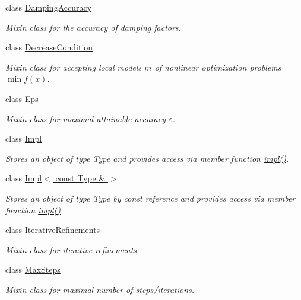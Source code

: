 \begin{DoxyCompactItemize}
class \hyperlink{classSpacy_1_1Mixin_1_1DampingAccuracy}{Damping\+Accuracy}
\begin{DoxyCompactList}\small\item\em Mixin class for the accuracy of damping factors. \end{DoxyCompactList}\item 
class \hyperlink{classSpacy_1_1Mixin_1_1DecreaseCondition}{Decrease\+Condition}
\begin{DoxyCompactList}\small\item\em Mixin class for accepting local models $m$ of nonlinear optimization problems $\min f(x)$. \end{DoxyCompactList}\item 
class \hyperlink{classSpacy_1_1Mixin_1_1Eps}{Eps}
\begin{DoxyCompactList}\small\item\em Mixin class for maximal attainable accuracy $\varepsilon$. \end{DoxyCompactList}\item 
class \hyperlink{classSpacy_1_1Mixin_1_1Impl}{Impl}
\begin{DoxyCompactList}\small\item\em Stores an object of type Type and provides access via member function \hyperlink{classSpacy_1_1Mixin_1_1Impl_a5e61399bae41338a87e701b24b13f52a}{impl()}. \end{DoxyCompactList}\item 
class \hyperlink{classSpacy_1_1Mixin_1_1Impl_3_01const_01Type_01_6_01_4}{Impl$<$ const Type \& $>$}
\begin{DoxyCompactList}\small\item\em Stores an object of type Type by const reference and provides access via member function \hyperlink{classSpacy_1_1Mixin_1_1Impl_3_01const_01Type_01_6_01_4_a5999a2a31217f4d4e5a0354f0bd14f66}{impl()}. \end{DoxyCompactList}\item 
class \hyperlink{classSpacy_1_1Mixin_1_1IterativeRefinements}{Iterative\+Refinements}
\begin{DoxyCompactList}\small\item\em Mixin class for iterative refinements. \end{DoxyCompactList}\item 
class \hyperlink{classSpacy_1_1Mixin_1_1MaxSteps}{Max\+Steps}
\begin{DoxyCompactList}\small\item\em Mixin class for maximal number of steps/iterations. \end{DoxyCompactList}\item 

\end{DoxyCompactItemize}

